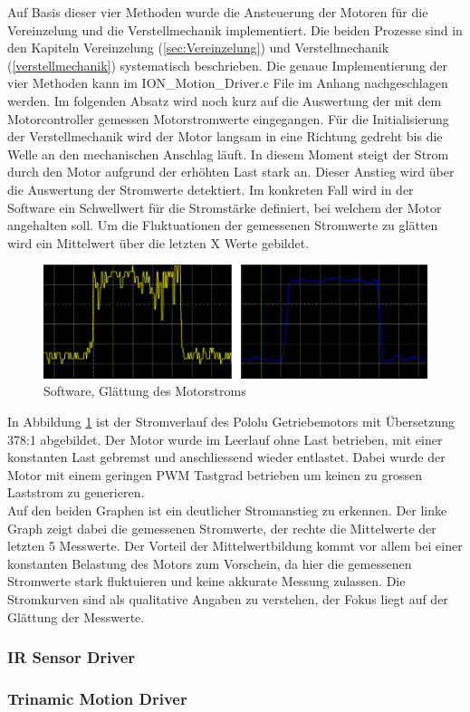 Auf Basis dieser vier Methoden wurde die Ansteuerung der Motoren für die Vereinzelung und die Verstellmechanik implementiert. Die beiden Prozesse sind in den Kapiteln Vereinzelung (\ref{sec:Vereinzelung}) und Verstellmechanik (\ref{verstellmechanik}) systematisch beschrieben. Die genaue Implementierung der vier Methoden kann im ION\_Motion\_Driver.c File im Anhang nachgeschlagen werden. Im folgenden Absatz wird noch kurz auf die Auswertung der mit dem Motorcontroller gemessen Motorstromwerte eingegangen.\newline
Für die Initialisierung der Verstellmechanik wird der Motor langsam in eine Richtung gedreht bis die Welle an den mechanischen Anschlag läuft. In diesem Moment steigt der Strom durch den Motor aufgrund der erhöhten Last stark an. Dieser Anstieg wird über die Auswertung der Stromwerte detektiert. Im konkreten Fall wird in der Software ein Schwellwert für die Stromstärke definiert, bei welchem der Motor angehalten soll. Um die Fluktuationen der gemessenen Stromwerte zu glätten wird ein Mittelwert über die letzten X Werte gebildet.


\begin{figure}[H]
	\includegraphics[width=1\textwidth]{Illustrationen/6-Umsetzung/ION_Motion_Strommessung.png}
	\caption{Software, Glättung des Motorstroms}
	\label{fig:ION_Motion_Strommessung}
\end{figure}

In Abbildung \ref{fig:ION_Motion_Strommessung} ist der Stromverlauf des Pololu Getriebemotors mit Übersetzung 378:1 abgebildet. Der Motor wurde im Leerlauf ohne Last betrieben, mit einer konstanten Last gebremst und anschliessend wieder entlastet. Dabei wurde der Motor mit einem geringen PWM Tastgrad betrieben um keinen zu grossen Laststrom zu generieren.\\
Auf den beiden Graphen ist ein deutlicher Stromanstieg zu erkennen. Der linke Graph zeigt dabei die gemessenen Stromwerte, der rechte die Mittelwerte der letzten 5 Messwerte. Der Vorteil der Mittelwertbildung kommt vor allem bei einer konstanten Belastung des Motors zum Vorschein, da hier die gemessenen Stromwerte stark fluktuieren und keine akkurate Messung zulassen. Die Stromkurven sind als qualitative Angaben zu verstehen, der Fokus liegt auf der Glättung der Messwerte.



\subsubsection{IR Sensor Driver}

\subsubsection{Trinamic Motion Driver}